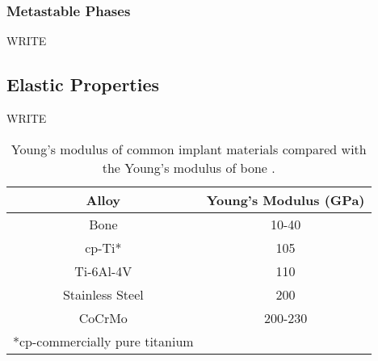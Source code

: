 \subsubsection{Metastable Phases}

WRITE 

\subsection{Elastic Properties}

WRITE

\pagebreak
\begin{table}
	\caption{Young's modulus of common implant materials compared with the Young's modulus of bone \cite{Long1998a}.}
	\centering
	\begin{tabular}{ c c }
		\hline
		Alloy & Young's Modulus (GPa) \\
		\hline
		Bone & 10-40\\
		cp-Ti* & 105\\
		Ti-6Al-4V & 110\\
		Stainless Steel & 200\\
		CoCrMo & 200-230\\
		\hline
		*cp-commercially pure titanium 
	\end{tabular}
\label{table:commonEM}
\end{table}
